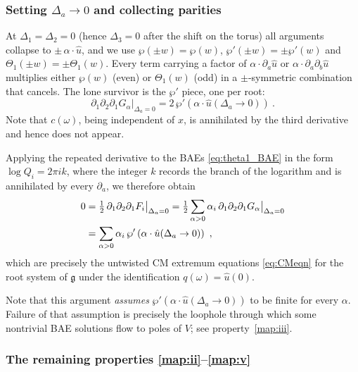 \documentclass[aps, prx, nofootinbib, twocolumn,amsfonts,amsmath,amssymb,mathtools,superscriptaddress,preprintnumbers,floatfix,reprint]{revtex4-2}
\newcommand{\alg}{\mathfrak{g}}
\begin{document}
\subsubsection{Setting \texorpdfstring{$\Delta_a\to0$}{Delta to 0} and collecting parities}

At $\Delta_1=\Delta_2=0$ (hence $\Delta_3=0$ after the shift on the torus) all arguments collapse to
$\pm\,\alpha\cdot \hat u$, and we use $\wp(\pm w)=\wp(w)$, $\wp'(\pm w)=\pm\wp'(w)$
and $\Theta_1(\pm w)=\pm\Theta_1(w)$. Every term carrying a factor of
$\alpha\cdot\partial_a \hat u$ or $\alpha\cdot\partial_a\partial_b \hat u$ multiplies either
$\wp(w)$ (even) or $\Theta_1(w)$ (odd) in a $\pm$-symmetric combination that
cancels. The lone survivor is the $\wp'$ piece, one per root:
\begin{equation}\label{eq:A2der}
  \partial_1\partial_2\partial_1 G_\alpha\big|_{\Delta_a=0}
  =2\,\wp'(\alpha\cdot \hat u (\Delta_a \to 0))\ .
\end{equation}
Note that $c(\omega)$, being independent of $x$, is annihilated by the third
derivative and hence does not appear.

Applying the repeated derivative to the BAEs \eqref{eq:theta1_BAE} in the form
$\log Q_i=2\pi i k$, where the integer $k$ records the branch of the logarithm
and is annihilated by every $\partial_a$, we therefore obtain
\begin{align}\label{eq:A3}
  0&=\tfrac12\,\partial_1\partial_2\partial_1F_i\big|_{\Delta_a=0}
   =\tfrac12\sum_{\alpha>0}\alpha_i\,
    \partial_1\partial_2\partial_1G_\alpha\big|_{\Delta_a=0}\notag\\
   &=\sum_{\alpha>0}\alpha_i\,\wp'\left(\alpha\cdot \hat u(\Delta_a\to 0)\right)\ ,
\end{align}
which are precisely the untwisted CM extremum equations \eqref{eq:CMeqn} for
the root system of $\alg$ under the identification $q(\omega)= \hat u(0)$.

Note that this argument \emph{assumes} $\wp'(\alpha\cdot\hat u(\Delta_a\to0))$ to be finite for every $\alpha$. Failure of that assumption is precisely the loophole through which some nontrivial BAE solutions flow to poles of $V$; see property~\ref{map:iii}.


\subsubsection{The remaining properties \ref{map:ii}--\ref{map:v}}
\label{subsub:otherprops}
\end{document}
